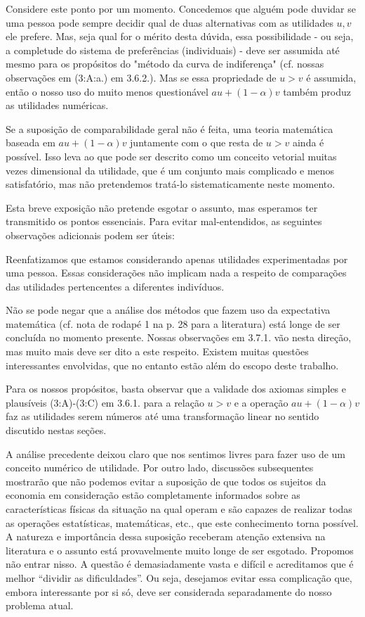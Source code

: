 \documentclass[a4paper,12pt]{article}[abntex2]
\begin{document}
Considere este ponto por um momento. Concedemos que alguém pode duvidar se uma pessoa pode sempre decidir qual de duas alternativas com as utilidades \( u, v \) ele prefere. Mas, seja qual for o mérito desta dúvida, essa possibilidade - ou seja, a completude do sistema de preferências (individuais) - deve ser assumida até mesmo para os propósitos do "método da curva de indiferença" (cf. nossas observações em (3:A:a.) em 3.6.2.). Mas se essa propriedade de \( u > v \) é assumida, então o nosso uso do muito menos questionável \( au + (1 - \alpha)v \) também produz as utilidades numéricas.

Se a suposição de comparabilidade geral não é feita, uma teoria matemática baseada em \( au + (1 - \alpha)v \) juntamente com o que resta de \( u > v \) ainda é possível. Isso leva ao que pode ser descrito como um conceito vetorial muitas vezes dimensional da utilidade, que é um conjunto mais complicado e menos satisfatório, mas não pretendemos tratá-lo sistematicamente neste momento.

Esta breve exposição não pretende esgotar o assunto, mas esperamos ter transmitido os pontos essenciais. Para evitar mal-entendidos, as seguintes observações adicionais podem ser úteis:

Reenfatizamos que estamos considerando apenas utilidades experimentadas por uma pessoa. Essas considerações não implicam nada a respeito de comparações das utilidades pertencentes a diferentes indivíduos.

Não se pode negar que a análise dos métodos que fazem uso da expectativa matemática (cf. nota de rodapé 1 na p. 28 para a literatura) está longe de ser concluída no momento presente. Nossas observações em 3.7.1. vão nesta direção, mas muito mais deve ser dito a este respeito. Existem muitas questões interessantes envolvidas, que no entanto estão além do escopo deste trabalho.

Para os nossos propósitos, basta observar que a validade dos axiomas simples e plausíveis (3:A)-(3:C) em 3.6.1. para a relação \( u > v \) e a operação \( au + (1 - \alpha)v \) faz as utilidades serem números até uma transformação linear no sentido discutido nestas seções.


A análise precedente deixou claro que nos sentimos livres para fazer uso de um conceito numérico de utilidade. Por outro lado, discussões subsequentes mostrarão que não podemos evitar a suposição de que todos os sujeitos da economia em consideração estão completamente informados sobre as características físicas da situação na qual operam e são capazes de realizar todas as operações estatísticas, matemáticas, etc., que este conhecimento torna possível. A natureza e importância dessa suposição receberam atenção extensiva na literatura e o assunto está provavelmente muito longe de ser esgotado. Propomos não entrar nisso. A questão é demasiadamente vasta e difícil e acreditamos que é melhor ``dividir as dificuldades''. Ou seja, desejamos evitar essa complicação que, embora interessante por si só, deve ser considerada separadamente do nosso problema atual.
\end{document}
